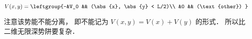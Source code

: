 
\begin{issues}
\issueDraft
\end{issues}

\begin{equation}
V(x,y) = \leftgroup{-&V_0 && (\abs{x}, \abs{y} < L/2)\\
&0 && (\text{other}) }
\end{equation}

注意该势能不能分离， 即不能记为 $V(x,y) = V(x) + V(y)$ 的形式． 所以比二维无限深势阱要复杂．

